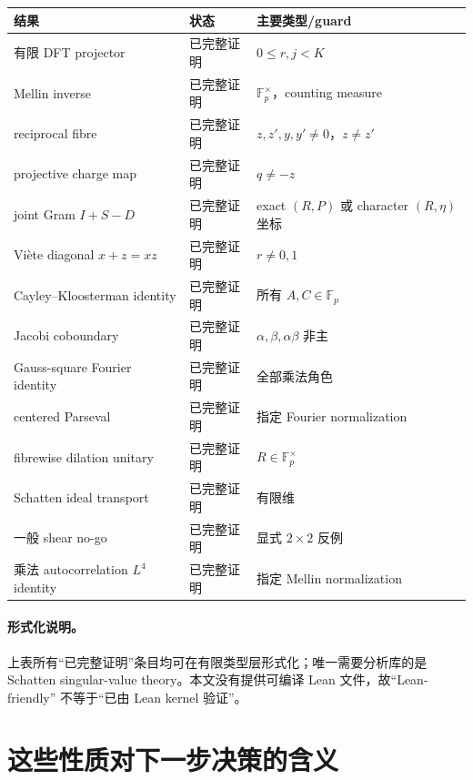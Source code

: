 \documentclass[11pt,a4paper]{ctexart}
\theoremstyle{definition}
\newcommand{\F}{\mathbb F}
\newcommand{\G}{\F_p^\times}
\newcommand{\1}{\mathbf 1}
\begin{document}
\begin{center}
\begin{tabular}{p{}p{}p{}}
\toprule
结果 & 状态 & 主要类型/guard\\
\midrule
有限 DFT projector & 已完整证明 & $0\le r,j<K$\\
Mellin inverse & 已完整证明 & $\G$，counting measure\\
reciprocal fibre & 已完整证明 & $z,z',y,y'\ne0$，$z\ne z'$\\
projective charge map & 已完整证明 & $q\ne-z$\\
joint Gram $I+S-D$ & 已完整证明 & exact $(R,P)$ 或 character $(R,\eta)$ 坐标\\
Vi\`ete diagonal $x+z=xz$ & 已完整证明 & $r\ne0,1$\\
Cayley--Kloosterman identity & 已完整证明 & 所有 $A,C\in\F_p$\\
Jacobi coboundary & 已完整证明 & $\alpha,\beta,\alpha\beta$ 非主\\
Gauss-square Fourier identity & 已完整证明 & 全部乘法角色\\
centered Parseval & 已完整证明 & 指定 Fourier normalization\\
fibrewise dilation unitary & 已完整证明 & $R\in\G$\\
Schatten ideal transport & 已完整证明 & 有限维\\
一般 shear no-go & 已完整证明 & 显式 $2\times2$ 反例\\
乘法 autocorrelation $L^4$ identity & 已完整证明 & 指定 Mellin normalization\\
\bottomrule
\end{tabular}
\end{center}

\paragraph{形式化说明。}
上表所有“已完整证明”条目均可在有限类型层形式化；唯一需要分析库的是
Schatten singular-value theory。本文没有提供可编译 Lean 文件，故“Lean-friendly”
不等于“已由 Lean kernel 验证”。

\section{这些性质对下一步决策的含义}
\end{document}
